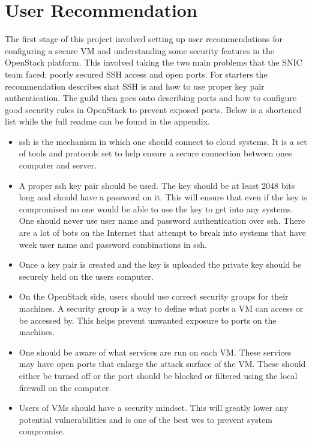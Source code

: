 \documentclass[12pt]{article}
\begin{document}
\section{User Recommendation}
The first stage of this project involved setting up user recommendations for configuring a secure VM and understanding some security features in the OpenStack platform. This involved taking the two main problems that the SNIC team faced: poorly secured SSH access and open ports. For starters the recommendation describes shat SSH is and how to use proper key pair authentication. The guild then goes onto describing ports and how to configure good security rules in OpenStack to prevent exposed ports. Below is a shortened list while the full readme can be found in the appendix. 

\begin{itemize}
    \item ssh is the mechanism in which one should connect to cloud systems. It is a set of tools and protocols set to help ensure a secure connection between ones computer and server. 
    \item A proper ssh key pair should be used. The key should be at least 2048 bits long and should have a password on it. This will ensure that even if the key is compromised no one would be able to use the key to get into any systems. One should never use user name and password authentication over ssh. There are a lot of bots on the Internet that attempt to break into systems that have week user name and password combinations in ssh. 
    \item Once a key pair is created and the key is uploaded the private key should be securely held on the users computer. 
    \item On the OpenStack side, users should use correct security groups for their machines. A security group is a way to define what ports a VM can access or be accessed by. This helps prevent unwanted exposure to ports on the machines. 
    \item One should be aware of what services are run on each VM. These services may have open ports that enlarge the attack surface of the VM. These should either be turned off or the port should be blocked or filtered using the local firewall on the computer. 
    \item Users of VMs should have a security mindset. This will greatly lower any potential vulnerabilities and is one of the best wes to prevent system compromise. 

\end{itemize}
\end{document}
